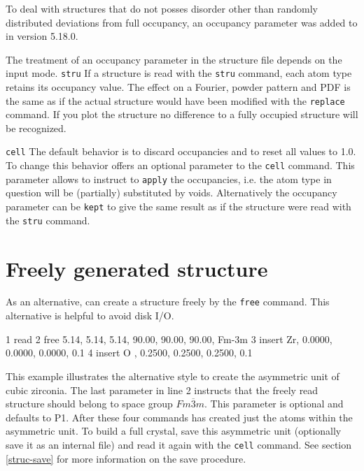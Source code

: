 To deal with structures that do not posses disorder other than randomly
distributed deviations from full occupancy, an occupancy parameter was
added to \Discus in version 5.18.0. 

The treatment of an occupancy parameter in the structure file
depends on the input mode. 
{\tt stru} If a structure is read with the {\tt stru} command, each
atom type retains its occupancy value. The effect on a Fourier, 
powder pattern and PDF is the same as if the actual structure would
have been modified with the {\tt replace} command. If you plot the 
structure no difference to a fully occupied structure will be 
recognized.

{\tt cell} The default behavior is to discard occupancies and to 
reset all values to 1.0. To change this behavior \Discus offers
an optional parameter to the {\tt cell} command. This parameter
allows to instruct \Discus to {\tt apply} the occupancies, i.e.
the atom type in question will be (partially) substituted by voids.
Alternatively the occupancy parameter can be {\tt kept} to give
the same result as if the structure were read with the {\tt stru}
command.

\section{Freely generated structure      \label{struc-free}}

As an alternative, \Discus can create a structure freely by the
{\tt free} command. This alternative is helpful to avoid 
disk I/O.

\begin{MacVerbatim}
    1  read
    2  free    5.14,  5.14,  5.14,  90.00, 90.00, 90.00, Fm-3m
    3  insert  Zr, 0.0000, 0.0000,  0.0000,  0.1
    4  insert  O , 0.2500, 0.2500,  0.2500,  0.1
\end{MacVerbatim}

This example illustrates the alternative style to create the 
asymmetric unit of cubic zirconia. The last parameter in line 2
instructs \Discus that the freely read structure should belong 
to space group $Fm\overline{3}m$. This parameter is optional
and defaults to P1. After these four commands \Discus has
created just the atoms within the asymmetric unit. To build 
a full crystal, save this asymmetric unit (optionally save it
as an internal file) and read it again with the {\tt cell} 
command. See section \ref{struc-save} for more information on 
the save procedure.

